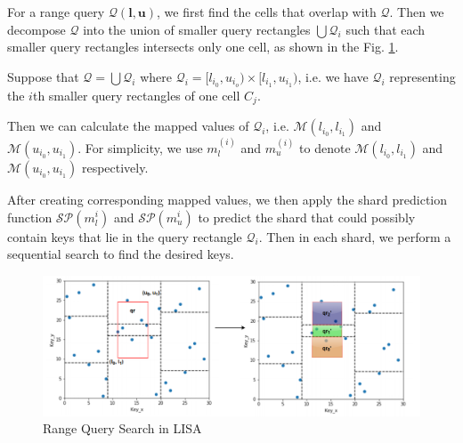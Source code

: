 For a range query $\mathcal{Q}(\boldsymbol{l},\boldsymbol{u})$, we first find the cells that overlap with $\mathcal{Q}$. Then we decompose $\mathcal{Q}$ into the union of smaller query rectangles $\bigcup \mathcal{Q}_i$ such that each smaller query rectangles intersects only one cell, as shown in the Fig. \ref{fig:Range_Query_LISA}.

 Suppose that $\mathcal{Q}=\bigcup \mathcal{Q}_i$ where $\mathcal{Q}_i=[l_{i_0}, u_{i_o})\times [l_{i_1}, u_{i_1})$, i.e. we have $\mathcal{Q}_i$ representing the $i$th smaller query rectangles of one cell $C_j$.
 
 Then we can calculate the mapped values of $\mathcal{Q}_i$, i.e. $\mathcal{M}(l_{i_0}, l_{i_1})$ and $\mathcal{M}(u_{i_0}, u_{i_1})$. For simplicity, we use $m_l^{(i)}$ and $m_u^{(i)}$ to denote $\mathcal{M}(l_{i_0}, l_{i_1})$ and $\mathcal{M}(u_{i_0}, u_{i_1})$ respectively.
 
After creating corresponding mapped values, we then apply the shard prediction function $\mathcal{SP}(m_{l}^{i})$ and $\mathcal{SP}(m_{u}^{i})$ to predict the shard that could possibly contain keys that lie in the query rectangle $\mathcal{Q}_i$. Then in each shard, we perform a sequential search to find the desired keys. 

\begin{figure}[!htb]
    \centering
    \includegraphics[width=\textwidth]{graphs/range_query_lisa.png}
    \caption{Range Query Search in LISA} 
    \label{fig:Range_Query_LISA}
\end{figure}

